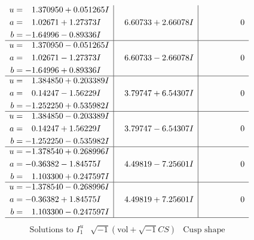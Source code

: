 \documentclass[1p]{elsarticle_modified}
\theoremstyle{definition}
\newcommand{\I}{\sqrt{-1}}
\begin{document}
$$\begin{array}{c|c|c}
\begin{aligned}
u &= \phantom{-}1.370950 + 0.051265 I \\
a &= \phantom{-}1.02671 + 1.27373 I \\
b &= -1.64996 - 0.89336 I\end{aligned}
 & \phantom{-}6.60733 + 2.66078 I & \phantom{-0.000000 } 0 \\ \hline\begin{aligned}
u &= \phantom{-}1.370950 - 0.051265 I \\
a &= \phantom{-}1.02671 - 1.27373 I \\
b &= -1.64996 + 0.89336 I\end{aligned}
 & \phantom{-}6.60733 - 2.66078 I & \phantom{-0.000000 } 0 \\ \hline\begin{aligned}
u &= \phantom{-}1.384850 + 0.203389 I \\
a &= \phantom{-}0.14247 - 1.56229 I \\
b &= -1.252250 + 0.535982 I\end{aligned}
 & \phantom{-}3.79747 + 6.54307 I & \phantom{-0.000000 } 0 \\ \hline\begin{aligned}
u &= \phantom{-}1.384850 - 0.203389 I \\
a &= \phantom{-}0.14247 + 1.56229 I \\
b &= -1.252250 - 0.535982 I\end{aligned}
 & \phantom{-}3.79747 - 6.54307 I & \phantom{-0.000000 } 0 \\ \hline\begin{aligned}
u &= -1.378540 + 0.268996 I \\
a &= -0.36382 - 1.84575 I \\
b &= \phantom{-}1.103300 + 0.247597 I\end{aligned}
 & \phantom{-}4.49819 - 7.25601 I & \phantom{-0.000000 } 0 \\ \hline\begin{aligned}
u &= -1.378540 - 0.268996 I \\
a &= -0.36382 + 1.84575 I \\
b &= \phantom{-}1.103300 - 0.247597 I\end{aligned}
 & \phantom{-}4.49819 + 7.25601 I & \phantom{-0.000000 } 0\\
 \hline 
 \end{array}$$\newpage$$\begin{array}{c|c|c}  
\text{Solutions to }I^u_{1}& \I (\text{vol} + \sqrt{-1}CS) & \text{Cusp shape}\\

\end{array}$$
\end{document}
